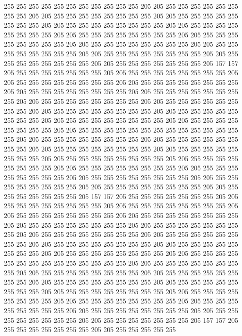 255 255 255 255 255 255 255 255 255 255 255 205 205 255 255 255 255 255 255 255
255 205 205 255 255 255 255 255 255 255 255 205 205 255 255 255 255 255 255 255
255 205 205 255 255 255 255 255 255 255 255 205 205 255 255 255 255 255 255 255
255 205 205 255 255 255 255 255 255 255 255 205 205 255 255 255 255 255 255 255
255 205 205 255 255 255 255 255 255 255 255 205 205 255 255 255 255 255 255 255
255 205 205 255 255 255 255 255 255 255 255 205 205 255 255 255 255 255 255 255
255 205 205 255 255 255 255 255 255 255 205 157 157 205 255 255 255 255 255 255
255 205 205 255 255 255 255 255 255 255 255 205 205 255 255 255 255 255 255 255
255 205 205 255 255 255 255 255 255 255 255 205 205 255 255 255 255 255 255 255
255 205 205 255 255 255 255 255 255 255 255 205 205 255 255 255 255 255 255 255
255 205 205 255 255 255 255 255 255 255 255 205 205 255 255 255 255 255 255 255
255 205 205 255 255 255 255 255 255 255 255 205 205 255 255 255 255 255 255 255
255 205 205 255 255 255 255 255 255 255 255 205 205 255 255 255 255 255 255 255
255 255 255 255 255 255 255 205 205 255 255 255 255 255 255 255 255 205 205 255
255 255 255 255 255 255 255 205 205 255 255 255 255 255 255 255 255 205 205 255
255 255 255 255 255 255 255 205 205 255 255 255 255 255 255 255 255 205 205 255
255 255 255 255 255 255 255 205 205 255 255 255 255 255 255 255 255 205 205 255
255 255 255 255 255 255 255 205 205 255 255 255 255 255 255 255 255 205 205 255
255 255 255 255 255 255 255 205 205 255 255 255 255 255 255 255 255 205 205 255
255 255 255 255 255 255 205 157 157 205 255 255 255 255 255 255 255 205 205 255
255 255 255 255 255 255 255 205 205 255 255 255 255 255 255 255 255 205 205 255
255 255 255 255 255 255 255 205 205 255 255 255 255 255 255 255 255 205 205 255
255 255 255 255 255 255 255 205 205 255 255 255 255 255 255 255 255 205 205 255
255 255 255 255 255 255 255 205 205 255 255 255 255 255 255 255 255 205 205 255
255 255 255 255 255 255 255 205 205 255 255 255 255 255 255 255 255 205 205 255
255 255 255 255 255 255 255 205 205 255 255 255 255 255 255 255 255 255 255 255
255 255 255 205 205 255 255 255 255 255 255 255 255 205 205 255 255 255 255 255
255 255 255 205 205 255 255 255 255 255 255 255 255 205 205 255 255 255 255 255
255 255 255 205 205 255 255 255 255 255 255 255 255 205 205 255 255 255 255 255
255 255 255 205 205 255 255 255 255 255 255 255 255 205 205 255 255 255 255 255
255 255 255 205 205 255 255 255 255 255 255 255 255 205 205 255 255 255 255 255
255 255 255 205 205 255 255 255 255 255 255 255 255 205 205 255 255 255 255 255
255 255 205 157 157 205 255 255 255 255 255 255 255 205 205 255 255 255 255 255
